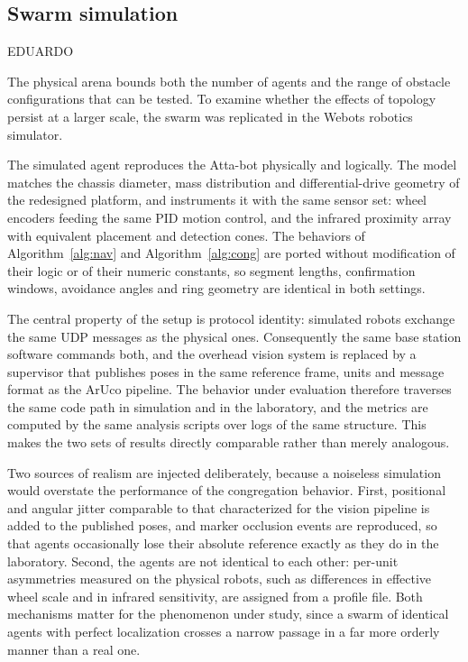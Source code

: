 \documentclass[conference]{IEEEtran}
\begin{document}
\subsection{Swarm simulation}
EDUARDO

The physical arena bounds both the number of agents and the range of obstacle
configurations that can be tested. To examine whether the effects of topology
persist at a larger scale, the swarm was replicated in the Webots robotics
simulator. %

The simulated agent reproduces the Atta-bot physically and logically. The model
matches the chassis diameter, mass distribution and differential-drive geometry
of the redesigned platform, and instruments it with the same sensor set: wheel
encoders feeding the same PID motion control, and the infrared proximity array
with equivalent placement and detection cones. The behaviors of
Algorithm~\ref{alg:nav} and Algorithm~\ref{alg:cong} are ported without
modification of their logic or of their numeric constants, so segment lengths,
confirmation windows, avoidance angles and ring geometry are identical in both
settings.

The central property of the setup is protocol identity: simulated robots exchange
the same UDP messages as the physical ones. Consequently the same base station
software commands both, and the overhead vision system is replaced by a
supervisor that publishes poses in the same reference frame, units and message
format as the ArUco pipeline. The behavior under evaluation therefore traverses
the same code path in simulation and in the laboratory, and the metrics are
computed by the same analysis scripts over logs of the same structure. This makes
the two sets of results directly comparable rather than merely analogous.

Two sources of realism are injected deliberately, because a noiseless simulation
would overstate the performance of the congregation behavior. First, positional
and angular jitter comparable to that characterized for the vision pipeline is
added to the published poses, and marker occlusion events are reproduced, so that
agents occasionally lose their absolute reference exactly as they do in the
laboratory. Second, the agents are not identical to each other: per-unit
asymmetries measured on the physical robots, such as differences in effective
wheel scale and in infrared sensitivity, are assigned from a profile file. Both
mechanisms matter for the phenomenon under study, since a swarm of identical
agents with perfect localization crosses a narrow passage in a far more orderly
manner than a real one.
\end{document}
